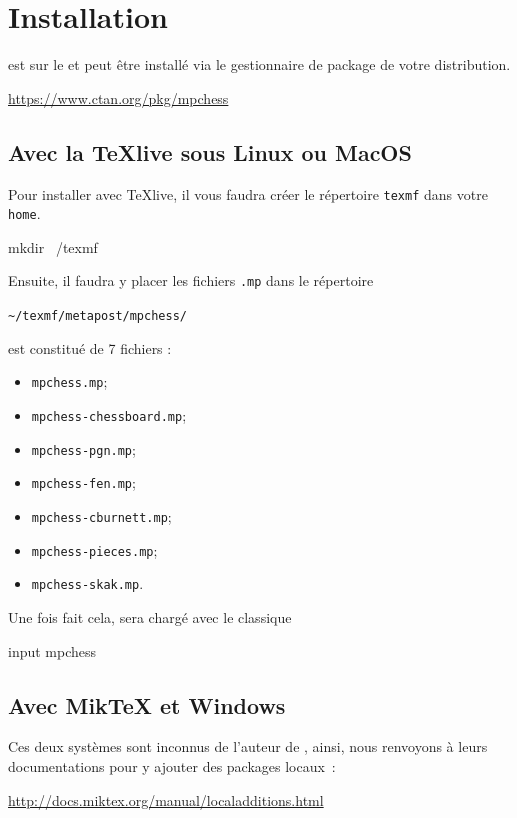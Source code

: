 \documentclass[french]{ltxdoc}
\begin{document}
\section{Installation}

\mpchess est sur le \ctan{} et peut être installé via le gestionnaire de package
de votre distribution.

\begin{center}
  \url{https://www.ctan.org/pkg/mpchess}
\end{center}


\subsection{Avec la \TeX live sous Linux ou MacOS}

Pour installer \mpchess avec \TeX live, il vous faudra créer le répertoire
\lstinline+texmf+ dans votre \lstinline+home+.

\begin{commandshell}
mkdir ~/texmf
\end{commandshell}

Ensuite, il faudra y placer les fichiers \lstinline+.mp+ dans le répertoire \begin{center}
  \lstinline+~/texmf/metapost/mpchess/+
\end{center}

\mpchess est constitué de 7 fichiers  :
\begin{itemize}
  \item \verb+mpchess.mp+;
  \item \verb+mpchess-chessboard.mp+;
  \item \verb+mpchess-pgn.mp+;
  \item \verb+mpchess-fen.mp+;
  \item \verb+mpchess-cburnett.mp+;
  \item \verb+mpchess-pieces.mp+;
  \item \verb+mpchess-skak.mp+.
\end{itemize}

Une fois fait cela, \mpchess sera chargé avec le classique
\begin{mpcode}
input mpchess
\end{mpcode}

\subsection{Avec Mik\TeX{} et Windows}

Ces deux systèmes sont inconnus de l’auteur de \mpchess, ainsi, nous renvoyons à
leurs documentations pour y ajouter des packages locaux :
\begin{center}
  \url{http://docs.miktex.org/manual/localadditions.html}
\end{center}
\end{document}
